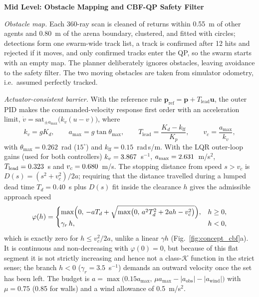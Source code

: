 \documentclass[10pt,letterpaper]{article}
\newif\ifafterheadone
\newcommand{\headingtwo}[1]{\par\ifafterheadone\nopagebreak\else\addpenalty{-200}\fi\vspace{6pt}%
    {\centering\fontsize{12}{14}\selectfont\bfseries #1\par}%
    \nopagebreak\vspace{2pt}\nopagebreak\global\afterheadonefalse\noindent\ignorespaces}
\begin{document}
\headingtwo{Mid Level: Obstacle Mapping and CBF-QP Safety Filter}
\emph{Obstacle map.} Each 360-ray scan is cleaned of returns within 0.55~m of other agents and
0.80~m of the arena boundary, clustered, and fitted with circles; detections form one swarm-wide
track list, a track is confirmed after 12 hits and rejected if it moves, and only confirmed tracks
enter the QP, so the swarm starts with an empty map. The planner deliberately ignores obstacles,
leaving avoidance to the safety filter. The two moving obstacles are taken from simulator
odometry, i.e.\ assumed perfectly tracked.

\emph{Actuator-consistent barrier.} With the reference rule $\mathbf{p}_{\mathrm{ref}}=\mathbf{p}+T_{\mathrm{lead}}\mathbf{u}$, the
outer PID makes the commanded-velocity response first order with an acceleration limit,
$\dot v=\mathrm{sat}_{\pm a_{\max}}\bigl(k_v(u-v)\bigr)$, where
\begin{equation}
    k_v=gK_d,\qquad a_{\max}=g\tan\theta_{\max},\qquad
    T_{\mathrm{lead}}=\frac{K_d-k_{\mathrm{ff}}}{K_p},\qquad v_c=\frac{a_{\max}}{k_v},
    \label{eq:plant}
\end{equation}
with $\theta_{\max}=0.262$~rad ($15^\circ$) and $k_{\mathrm{ff}}=0.15$~rad\,s/m. With the LQR outer-loop gains
(used for both controllers) $k_v=3.867$~s$^{-1}$, $a_{\max}=2.631$~m/s$^2$,
$T_{\mathrm{lead}}=0.323$~s and $v_c=0.680$~m/s. The stopping distance from speed
$s>v_c$ is $D(s)=(s^2+v_c^2)/2a$; requiring that the distance travelled during a lumped dead time
$T_d=0.40$~s plus $D(s)$ fit inside the clearance $h$ gives the admissible approach speed
\begin{equation}
    \varphi(h)=
    \begin{cases}
        \max\Bigl(0,\,-aT_d+\sqrt{\max\bigl(0,\,a^2T_d^2+2ah-v_c^2\bigr)}\Bigr), & h\ge 0,\\
        \gamma_r\,h, & h<0,
    \end{cases}
    \label{eq:phi}
\end{equation}
which is exactly zero for $h\le v_c^2/2a$, unlike a linear $\gamma h$
(Fig.~\ref{fig:concept_cbf}a). It is continuous and non-decreasing with $\varphi(0)=0$, but because
of this flat segment it is not strictly increasing and hence not a class-$\mathcal{K}$ function in the
strict sense; the branch $h<0$ ($\gamma_r=3.5$~s$^{-1}$) demands an outward
velocity once the set has been left. The budget is
$a=\max\bigl(0.15a_{\max},\,\mu a_{\max}-|a_{\mathrm{obs}}|-|a_{\mathrm{wind}}|\bigr)$ with
$\mu=0.75$ (0.85 for walls) and a wind allowance of 0.5~m/s$^2$.
\end{document}
